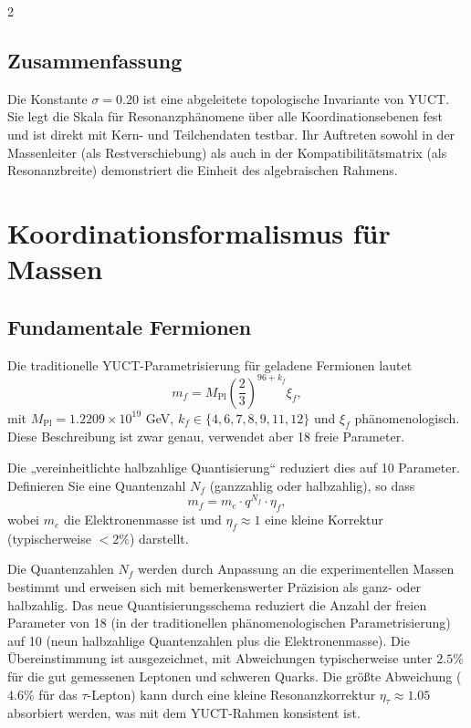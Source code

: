 \documentclass[11pt,a4paper]{article}
\begin{document}
\begin{multicols}{2}
		\subsection{Zusammenfassung}
		Die Konstante $\sigma = 0.20$ ist eine abgeleitete topologische Invariante von YUCT. Sie legt die Skala für Resonanzphänomene über alle Koordinationsebenen fest und ist direkt mit Kern- und Teilchendaten testbar. Ihr Auftreten sowohl in der Massenleiter (als Restverschiebung) als auch in der Kompatibilitätsmatrix (als Resonanzbreite) demonstriert die Einheit des algebraischen Rahmens.
		
		\section{Koordinationsformalismus für Massen}
		\label{sec:formalism}
		
		\subsection{Fundamentale Fermionen}
		
		Die traditionelle YUCT-Parametrisierung für geladene Fermionen lautet
		\begin{equation}
			m_f = M_{\mathrm{Pl}} \left( \frac{2}{3} \right)^{96 + k_f} \xi_f,
			\label{eq:mass_fermion}
		\end{equation}
		mit \(M_{\mathrm{Pl}} = 1.2209\times 10^{19}\) GeV, \(k_f \in \{4,6,7,8,9,11,12\}\) und \(\xi_f\) phänomenologisch. Diese Beschreibung ist zwar genau, verwendet aber 18 freie Parameter.
		
		Die „vereinheitlichte halbzahlige Quantisierung“ reduziert dies auf 10 Parameter. Definieren Sie eine Quantenzahl \(N_f\) (ganzzahlig oder halbzahlig), so dass
		\begin{equation}
			m_f = m_e \cdot q^{N_f} \cdot \eta_f,
			\label{eq:mass_quantized}
		\end{equation}
		wobei \(m_e\) die Elektronenmasse ist und \(\eta_f \approx 1\) eine kleine Korrektur (typischerweise \(<2\%\)) darstellt.
		
		Die Quantenzahlen \(N_f\) werden durch Anpassung an die experimentellen Massen bestimmt und erweisen sich mit bemerkenswerter Präzision als ganz- oder halbzahlig.
		Das neue Quantisierungsschema reduziert die Anzahl der freien Parameter von 18 (in der traditionellen phänomenologischen Parametrisierung) auf 10 (neun halbzahlige Quantenzahlen plus die Elektronenmasse).
		Die Übereinstimmung ist ausgezeichnet, mit Abweichungen typischerweise unter \(2.5\%\) für die gut gemessenen Leptonen und schweren Quarks.
		Die größte Abweichung (\(4.6\%\) für das \(\tau\)-Lepton) kann durch eine kleine Resonanzkorrektur \(\eta_\tau \approx 1.05\) absorbiert werden, was mit dem YUCT-Rahmen konsistent ist.
		

\end{multicols}
\end{document}
